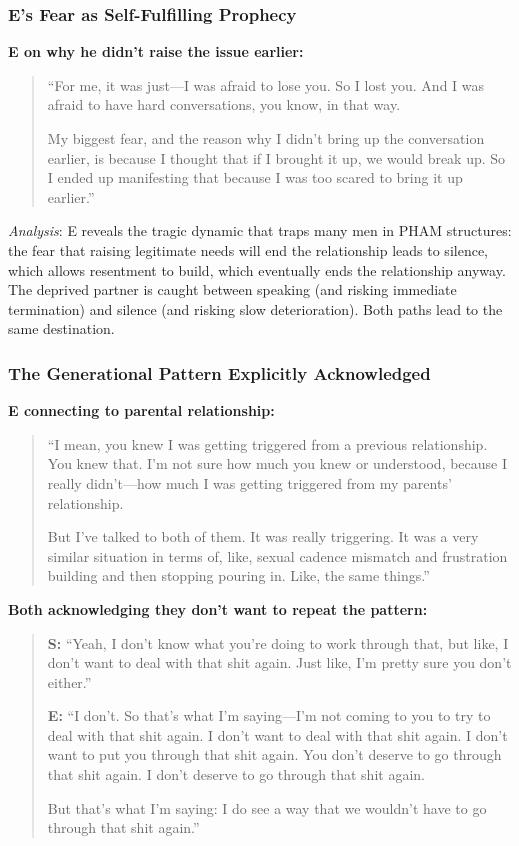 \documentclass[12pt, letterpaper]{article}
\begin{document}
\subsubsection{E's Fear as Self-Fulfilling Prophecy}

\textbf{E on why he didn't raise the issue earlier:}
\begin{quote}
``For me, it was just---I was afraid to lose you. So I lost you. And I was afraid to have hard conversations, you know, in that way.

My biggest fear, and the reason why I didn't bring up the conversation earlier, is because I thought that if I brought it up, we would break up. So I ended up manifesting that because I was too scared to bring it up earlier.''
\end{quote}

\textit{Analysis}: E reveals the tragic dynamic that traps many men in PHAM structures: the fear that raising legitimate needs will end the relationship leads to silence, which allows resentment to build, which eventually ends the relationship anyway. The deprived partner is caught between speaking (and risking immediate termination) and silence (and risking slow deterioration). Both paths lead to the same destination.

\subsubsection{The Generational Pattern Explicitly Acknowledged}

\textbf{E connecting to parental relationship:}
\begin{quote}
``I mean, you knew I was getting triggered from a previous relationship. You knew that. I'm not sure how much you knew or understood, because I really didn't---how much I was getting triggered from my parents' relationship.

But I've talked to both of them. It was really triggering. It was a very similar situation in terms of, like, sexual cadence mismatch and frustration building and then stopping pouring in. Like, the same things.''
\end{quote}

\textbf{Both acknowledging they don't want to repeat the pattern:}
\begin{quote}
\textbf{S:} ``Yeah, I don't know what you're doing to work through that, but like, I don't want to deal with that shit again. Just like, I'm pretty sure you don't either.''

\textbf{E:} ``I don't. So that's what I'm saying---I'm not coming to you to try to deal with that shit again. I don't want to deal with that shit again. I don't want to put you through that shit again. You don't deserve to go through that shit again. I don't deserve to go through that shit again.

But that's what I'm saying: I do see a way that we wouldn't have to go through that shit again.''
\end{quote}
\end{document}
